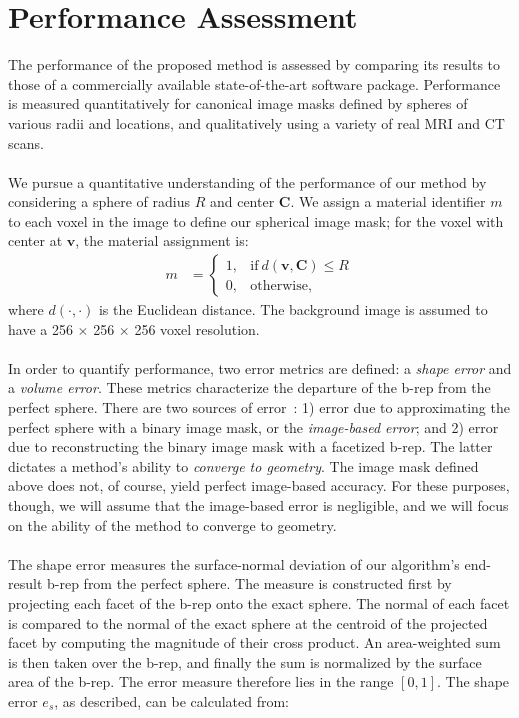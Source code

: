 \section{Performance Assessment}
%

The performance of the proposed method is assessed by comparing its results to those of a commercially available state-of-the-art software package. Performance is measured quantitatively for canonical image masks defined by spheres of various radii and locations, and qualitatively using a variety of real MRI and CT scans. \\ \\
%
We pursue a quantitative understanding of the performance of our method by considering a sphere of radius $R$ and center $\bm{C}$.  We assign a material identifier $m$ to each voxel in the image to define our spherical image mask; for the voxel with center at $\bm{v}$, the material assignment is:
\begin{align} 
	m &=  \begin{cases}
		1, & \text{if}\ d \left(\bm{v},\bm{C}\right) \le R \\
		0, & \text{otherwise},
	\end{cases}
\end{align}
where $d(\cdot,\cdot)$ is the Euclidean distance. The background image is assumed to have a 256 $\times$ 256 $\times$ 256 voxel resolution. \\ \\
%
In order to quantify performance, two error metrics are defined: a {\em shape error} and a {\em volume error}. These metrics characterize the departure of the b-rep from the perfect sphere.  There are two sources of error~\cite{young_2008}: 1) error due to approximating the perfect sphere with a binary image mask, or the {\em image-based error}; and 2) error due to reconstructing the binary image mask with a facetized b-rep.  The latter dictates a method's ability to {\em converge to geometry}. The image mask defined above does not, of course, yield perfect image-based accuracy. For these purposes, though, we will assume that the image-based error is negligible, and we will focus on the ability of the method to converge to geometry.\\ \\
%
The shape error measures the surface-normal deviation of our algorithm's end-result b-rep from the perfect sphere. The measure is constructed first by projecting each facet of the b-rep onto the exact sphere. The normal of each facet is compared to the normal of the exact sphere at the centroid of the projected facet by computing the magnitude of their cross product. An area-weighted sum is then taken over the b-rep, and finally the sum is normalized by the surface area of the b-rep. The error measure therefore lies in the range $\left [0,1\right]$. The shape error $e_s$, as described, can be calculated from:
